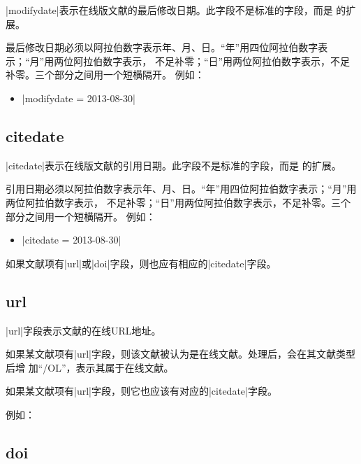 |modifydate|表示在线版文献的最后修改日期。此字段不是标准的{\BibTeX}字段，而是{\njuthesis}
的扩展。

最后修改日期必须以阿拉伯数字表示年、月、日。“年”用四位阿拉伯数字表示；“月”用两位阿拉伯数字表示，
不足补零；“日”用两位阿拉伯数字表示，不足补零。三个部分之间用一个短横隔开。
例如：
\begin{itemize}
\item |modifydate = {2013-08-30}|
\end{itemize}

\subsection{citedate}\label{subsec:bibfield-citedate}

|citedate|表示在线版文献的引用日期。此字段不是标准的{\BibTeX}字段，而是{\njuthesis}
的扩展。

引用日期必须以阿拉伯数字表示年、月、日。“年”用四位阿拉伯数字表示；“月”用两位阿拉伯数字表示，
不足补零；“日”用两位阿拉伯数字表示，不足补零。三个部分之间用一个短横隔开。
例如：
\begin{itemize}
\item |citedate = {2013-08-30}|
\end{itemize}

如果文献项有|url|或|doi|字段，则也应有相应的|citedate|字段。

\subsection{url}\label{subsec:bibfield-url}

|url|字段表示文献的在线URL地址。

如果某文献项有|url|字段，则该文献被认为是在线文献。{\BibTeX}处理后，会在其文献类型后增
加``/OL''，表示其属于在线文献。

如果某文献项有|url|字段，则它也应该有对应的|citedate|字段。

例如：

\subsection{doi}\label{subsec:bibfield-doi}

